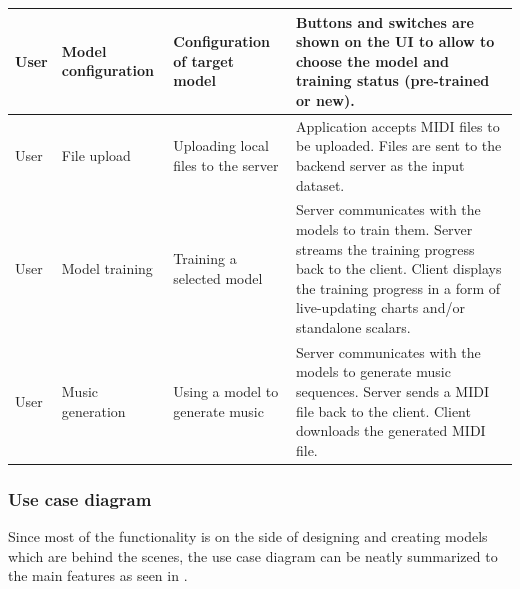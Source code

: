 \documentclass[a4paper, 11pt, twoside]{report}
\theoremstyle{definition}
\begin{document}
\begin{longtable}{ |S{0.12\textwidth}|S{0.15\textwidth}|S{0.25\textwidth}|S{0.37\textwidth}| }
    \setlength{\baselineskip}{16pt}User      & \setlength{\baselineskip}{16pt}Model configuration & \setlength{\baselineskip}{16pt}Configuration of target model               & \setlength{\baselineskip}{16pt}Buttons and switches are shown on the UI to allow to choose the model and training status (pre-trained or new).                                                                                                \\ \hline
    \setlength{\baselineskip}{16pt}User      & \setlength{\baselineskip}{16pt}File upload         & \setlength{\baselineskip}{16pt}Uploading local files to the server         & \setlength{\baselineskip}{16pt}Application accepts MIDI files to be uploaded. Files are sent to the backend server as the input dataset.                                                                                                      \\ \hline
    \setlength{\baselineskip}{16pt}User      & \setlength{\baselineskip}{16pt}Model training      & \setlength{\baselineskip}{16pt}Training a selected model                   & \setlength{\baselineskip}{16pt}Server communicates with the models to train them. Server streams the training progress back to the client. Client displays the training progress in a form of live-updating charts and/or standalone scalars. \\ \hline
    \setlength{\baselineskip}{16pt}User      & \setlength{\baselineskip}{16pt}Music generation    & \setlength{\baselineskip}{16pt}Using a model to generate music             & \setlength{\baselineskip}{16pt}Server communicates with the models to generate music sequences. Server sends a MIDI file back to the client. Client downloads the generated MIDI file.                                                        \\ \hline
\end{longtable}

\vfill
\subsubsection{Use case diagram}

Since most of the functionality is on the side of designing and creating models which are behind the scenes, the use case diagram can be neatly summarized to the main features as seen in . \par

\vfill
\newpage
\end{document}
